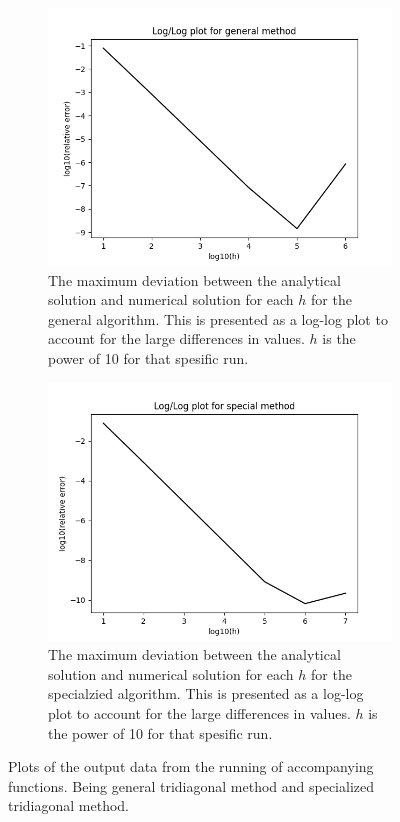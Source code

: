 \documentclass[10pt, a4paper]{amsart}
\begin{document}
\begin{figure}
\begin{subfigure}[b]{0.45\textwidth}
 \centering
 \includegraphics[width=0.9\linewidth]{../code/plots/error_general.png}
 \caption{The maximum deviation between the analytical solution and numerical solution for each $h$ for the general algorithm. This is presented as a log-log plot to account for the large differences in values. $h$ is the power of 10 for that spesific run.}
 \label{fig:errgeneral}
\end{subfigure}
\quad
\begin{subfigure}[b]{0.45\textwidth}
 \centering
 \includegraphics[width=0.9\linewidth]{../code/plots/error_special.png}
 \caption{The maximum deviation between the analytical solution and numerical solution for each $h$ for the specialzied algorithm. This is presented as a log-log plot to account for the large differences in values. $h$ is the power of 10 for that spesific run.}
 \label{fig:errspecial}
\end{subfigure}
\caption{Plots of the output data from the running of accompanying functions. Being general tridiagonal method and specialized tridiagonal method.}
\label{fig:fig}
\end{figure}
\end{document}
